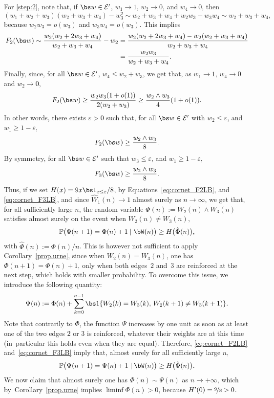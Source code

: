 For \eqref{step:2}, note that,
if $\bs w\in \mathcal E'$, $w_1\to 1$, $w_2 \to 0$, and $w_4\to 0$,
then
\[
({w_1}+w_2+w_3)(w_2+w_3+w_4)-w_3^2
\sim w_2+w_3+w_4 + w_2w_3 + w_3w_4
\sim w_2+w_3+w_4,
\]
because $w_2w_3 = o(w_3)$ and $w_3w_4=o(w_3)$.
This implies
\begin{align*}
F_2(\bs w)
\sim \frac{w_2(w_2+2w_3+w_4)}{w_2+w_3+w_4}-w_2
&= \frac{w_2(w_2+2w_3+w_4) - w_2(w_2+w_3+w_4)}
{w_2+w_3+w_4}\\
&=\frac{w_2w_3}{w_2+w_3+w_4}.
\end{align*}
Finally, since, for all $\bs w\in\mathcal E'$, $w_4\leq w_2+w_3$, we get that, as $w_1\to 1$, $w_4\to 0$ and $w_2\to 0$,
\[
F_2(\bs w) \geq \frac{w_2w_3(1+o(1))}{2(w_2+w_3)} \geq \frac{w_2\wedge w_3}{{4}}(1+o(1)).
\]
In other words, there exists $\varepsilon>0$ such that, for all $\bs w\in\mathcal E'$ with $w_2\leq \varepsilon$, and $w_1\geq 1-\varepsilon$,%
\begin{equation}\label{eq:cornet_F2LB}
F_2(\bs w)\geq \frac{w_2\wedge w_3}{8}.
\end{equation}
By symmetry, for all $\bs w\in\mathcal E'$ such that $w_3\leq \varepsilon$, and $w_1\geq 1-\varepsilon$,
\begin{equation}\label{eq:cornet_F3LB}
F_3(\bs w)\geq \frac{w_2\wedge w_3}{8}.
\end{equation}
Thus, if we set $H(x) = {9x \bs 1_{x\leq\varepsilon}/8}$,
by Equations~\eqref{eq:cornet_F2LB}, and \eqref{eq:cornet_F3LB},
and since $\hat W_1(n)\to 1$ almost surely as $n\to\infty$, we get that,
for all sufficiently large $n$,
the random variable $\Phi(n):=W_2(n)\wedge W_3(n)$ satisfies almost surely on the event when $W_2(n)\neq W_3(n)$,
\begin{equation}\label{Phi.acc}
\mathbb P\big(\Phi(n+1)= \Phi(n)+1\mid \bW(n)\big) \geq H\big(\hat \Phi(n)\big),
\end{equation}
with $\hat \Phi(n) := \Phi(n)/n$.
This is however not sufficient to apply Corollary~\ref{prop.urne}, since when $W_2(n) = W_3(n)$, one has $\Phi(n+1) = \Phi(n)+1$, only when both edges~$2$ and~$3$
are reinforced at the next step, which holds with smaller probability.
To overcome this issue, we introduce the following quantity:
\[
\Psi(n) := \Phi(n) + \sum_{k=0}^{n-1} \bs 1\{W_2(k) = W_3(k), \, W_2(k+1) \neq W_3(k+1)\}. 
\]
Note that contrarily to $\Phi$, the function $\Psi$ increases by one unit as soon as at least one of the two edges $2$ or $3$ is reinforced, whatever their weights are at this time (in~particular this holds even when
they are equal).
Therefore, \eqref{eq:cornet_F2LB} and~\eqref{eq:cornet_F3LB}
imply that, almost surely for all sufficiently large $n$,
\begin{equation}\label{Psi.acc}
\mathbb P\big(\Psi(n+1)= \Psi(n)+1\mid \bW(n)\big) \geq H\big(\hat\Phi(n)\big).
\end{equation}
We now claim that almost surely one has $\Phi(n) \sim \Psi(n)$ as $n\to+\infty$,
which by~Corollary~\ref{prop.urne}
implies $\liminf \Phi(n)>0$, because $H'(0)={\nicefrac 98}>0$.

